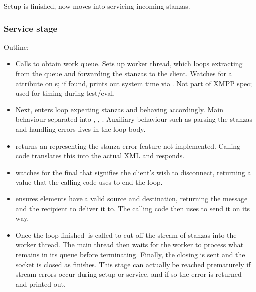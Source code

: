 \documentclass[12pt,a4paper,twoside,openright]{report}
\begin{document}
{\begin{itemize}
  Setup is finished, now moves into servicing incoming stanzas.
\end{itemize}

\subsubsection{Service stage}
Outline:

\begin{itemize}
  \item Calls  to obtain work queue. Sets up worker thread, which loops extracting from the queue and forwarding the stanzas to the client. Watches for a  attribute on s; if found, prints out system time via . Not part of XMPP spec; used for timing during test/eval.

  \item Next, enters loop expecting stanzas and behaving accordingly. Main behaviour separated into , , . Auxiliary behaviour such as parsing the stanzas and handling errors lives in the loop body.

  \item {} returns an  representing the stanza error feature-not-implemented. Calling code translates this into the actual XML and responds.

  \item {} watches for the final  that signifies the client's wish to disconnect, returning a value that the calling code uses to end the loop.

  \item {} ensures  elements have a valid source and destination, returning the message and the recipient to deliver it to. The calling code then uses  to send it on its way.

  \item Once the loop finished,  is called to cut off the stream of stanzas into the worker thread. The main thread then waits for the worker to process what remains in its queue before terminating. Finally, the closing  is sent and the socket is closed as  finishes. This stage can actually be reached prematurely if stream errors occur during setup or service, and if so the error is returned and printed out.
\end{itemize}

}
\end{document}
